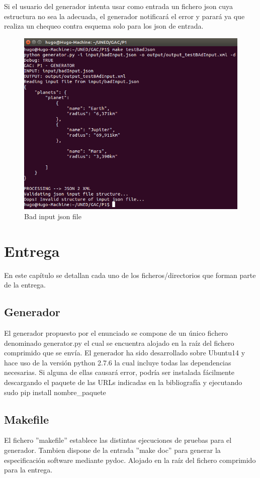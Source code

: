 \documentclass[a4paper,11pt]{book}
\begin{document}
Si el usuario del generador intenta usar como entrada un fichero json cuya estructura no sea la adecuada, el generador notificará el error y parará ya que realiza un chequeo contra esquema solo para los json de entrada. 

\begin{figure}[H]  
\centering 
\includegraphics[scale=0.35]{imagenes/badInput.png}
\caption{ Bad input json file  }  
\end{figure}

\chapter{Entrega}
En este capítulo se detallan cada uno de los ficheros/directorios que forman parte de la entrega. 

\section{Generador}
El generador propuesto por el enunciado se compone de un único fichero denominado generator.py el cual se encuentra alojado en la raíz del fichero comprimido que se envía. El generador ha sido desarrollado sobre Ubuntu14 y hace uso de la versión python 2.7.6 la cual incluye todas las dependencias necesarias. Si alguna de ellas causará error, podría ser instalada fácilmente descargando el paquete de las URLs indicadas en la bibliografía y ejecutando sudo pip install nombre\_paquete 

\section{Makefile}
El fichero ''makefile'' establece las distintas ejecuciones de pruebas para el generador. Tambien dispone de la entrada ''make doc'' para generar la especificación software mediante pydoc. Alojado en la raíz del fichero comprimido para la entrega. 
\end{document}
